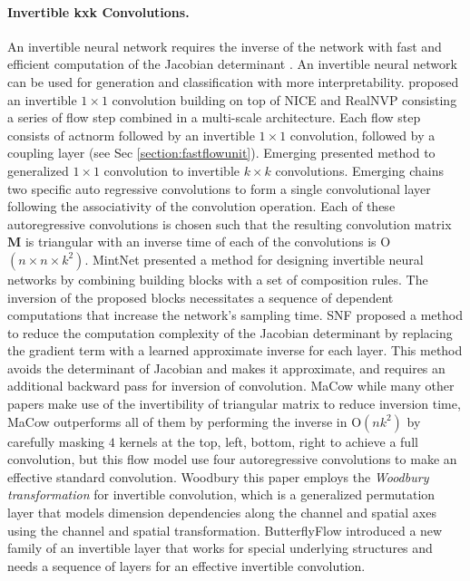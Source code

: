 \documentclass[a4paper,twoside]{article}
\theoremstyle{definition}
\begin{document}
\paragraph{Invertible kxk Convolutions.}
An invertible neural network requires the inverse of the network with fast and efficient computation of the Jacobian determinant \citep{song2019mintnet}. An invertible neural network can be used for generation and classification with more interpretability. \citep{kingma2018glow} proposed an invertible $1 \times 1$ convolution building on top of NICE \citep{dinh2014nice}  and RealNVP \citep{dinh2016density} consisting a series of flow step combined in a multi-scale architecture. Each flow step consists of actnorm followed by an invertible $1 \times 1$ convolution, followed by a coupling layer (see Sec \ref{section:fastflowunit}). Emerging \citep{hoogeboom2019emerging} presented method to generalized $1 \times 1$ convolution to invertible $ k \times k$ convolutions. Emerging chains two specific auto regressive convolutions \citep{kingma2013auto} to form a single convolutional layer following the associativity of the convolution operation. Each of these autoregressive convolutions is chosen such that the resulting convolution matrix $\mathbf{M}$ is triangular with an inverse time of each of the convolutions is O$(n  \times n \times k^2)$. MintNet \citep{song2019mintnet} presented a method for designing invertible neural networks by combining building blocks with a set of composition rules. The inversion of the proposed blocks necessitates a sequence of dependent computations that increase the network's sampling time. SNF \citep{keller2021self} proposed a method to reduce the computation complexity of the Jacobian determinant by replacing the gradient term with a learned approximate inverse for each layer. This method avoids the determinant of Jacobian and makes it approximate, and requires an additional backward pass for inversion of convolution. MaCow \citep{ma2019macow} while many other papers make use of the invertibility of triangular matrix to reduce inversion time, MaCow outperforms all of them by performing the inverse in O$(n k^2)$ by carefully masking $4$ kernels at the top, left, bottom, right to achieve a full convolution, but this flow model use four autoregressive convolutions to make an effective standard convolution. Woodbury \citep{lu2020woodbury} this paper employs the \emph{Woodbury transformation} for invertible convolution, which is a generalized permutation layer that models dimension dependencies along the channel and spatial axes using the channel and spatial transformation. ButterflyFlow \citep{meng2022butterflyflow} introduced a new family of an invertible layer that works for special underlying structures and needs a sequence of layers for an effective invertible convolution.
\end{document}

